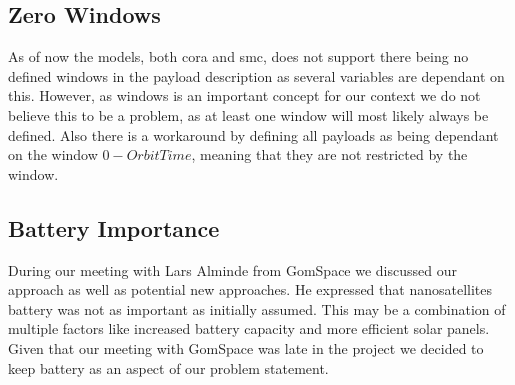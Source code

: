\subsection*{Zero Windows}
As of now the models, both \gls{cora} and \gls{smc}, does not support there being no defined windows in the payload description as several variables are dependant on this. However, as windows is an important concept for our context we do not believe this to be a problem, as at least one window will most likely always be defined. Also there is a workaround by defining all payloads as being dependant on the window $0-OrbitTime$, meaning that they are not restricted by the window.

\subsection*{Battery Importance}
During our meeting with Lars Alminde from GomSpace we discussed our approach as well as potential new approaches. He expressed that nanosatellites battery was not as important as initially assumed\cite{gom_space_conversation}. This may be a combination of multiple factors like increased battery capacity and more efficient solar panels. Given that our meeting with GomSpace was late in the project we decided to keep battery as an aspect of our problem statement.


